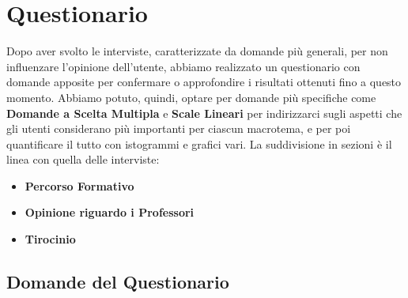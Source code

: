 \begin{enumerate}
\end{enumerate}





\section{Questionario}

Dopo aver svolto le interviste, caratterizzate da domande più generali, per non influenzare l'opinione dell'utente, abbiamo realizzato un questionario
con domande apposite per confermare o approfondire i risultati ottenuti fino a questo momento. Abbiamo potuto, quindi, optare per domande più specifiche
come \textbf{Domande a Scelta Multipla} e \textbf{Scale Lineari} per indirizzarci sugli aspetti che gli utenti considerano più importanti per ciascun macrotema,
e per poi quantificare il tutto con istogrammi e grafici vari. La suddivisione in sezioni è il linea con quella delle interviste:
\begin{itemize}
    \item \textbf{Percorso Formativo}
    \item \textbf{Opinione riguardo i Professori}
    \item \textbf{Tirocinio}
\end{itemize}


\subsection{Domande del Questionario}

